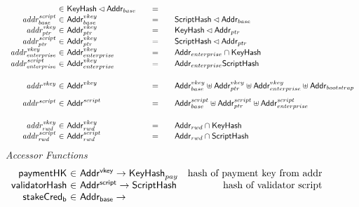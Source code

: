 \begin{figure*}[hbt]
\begin{equation*}
\begin{array}{r@{~\in~}l@{\qquad=\qquad}lr}
                               & \KeyHash\restrictdom\Addr_{base}
      \\
      \var{addr^{script}_{base}}
                 & \Addr^{vkey}_{base}
                               & \HashScr\restrictdom\Addr_{base}
      \\
      \var{addr^{vkey}_{ptr}}
                 & \Addr^{vkey}_{ptr}
                               & \KeyHash\restrictdom\Addr_{ptr}
      \\
      \var{addr^{script}_{ptr}}
                 & \Addr^{vkey}_{ptr}
                               & \HashScr\restrictdom\Addr_{ptr}
      \\
      \var{addr^{vkey}_{enterprise}}
                 & \Addr^{vkey}_{enterprise}
                               & \Addr_{enterprise}\cap\KeyHash
      \\
      \var{addr^{script}_{enterprise}}
                 & \Addr^{vkey}_{enterprise}
                               & \Addr_{enterprise}\HashScr
      \\[0.5cm]
      \var{addr^{vkey}} &
             \Addr^{vkey} &
                            \Addr^{vkey}_{base} \uniondistinct \Addr^{vkey}_{ptr} \uniondistinct \Addr^{vkey}_{enterprise} \uniondistinct \Addr_{bootstrap}\\[0.3cm]
      \var{addr^{script}} &
                            \Addr^{script} &
                                             \Addr^{script}_{base}
                                             \uniondistinct \Addr^{script}_{ptr}
                                             \uniondistinct
                                             \Addr^{script}_{enterprise}
      \\[0.5cm]
      \var{addr_{rwd}^{vkey}} & \Addr_{rwd}^{vkey} & \Addr_{rwd}\cap\KeyHash \\
      \var{addr_{rwd}^{script}} & \Addr_{rwd}^{script} & \Addr_{rwd}\cap\HashScr \\
    \end{array}
  \end{equation*}
  \emph{Accessor Functions}
  \begin{equation*}
    \begin{array}{r@{~\in~}lr}
      \fun{paymentHK} & \AddrVKey \to \KeyHash_{pay}
      & \text{hash of payment key from addr}\\
      \fun{validatorHash} & \AddrScr \to \HashScr & \text{hash of validator
                                                    script} \\
            \fun{stakeCred_{b}} & \AddrB \to

\end{array}
\end{equation*}
\end{figure*}

